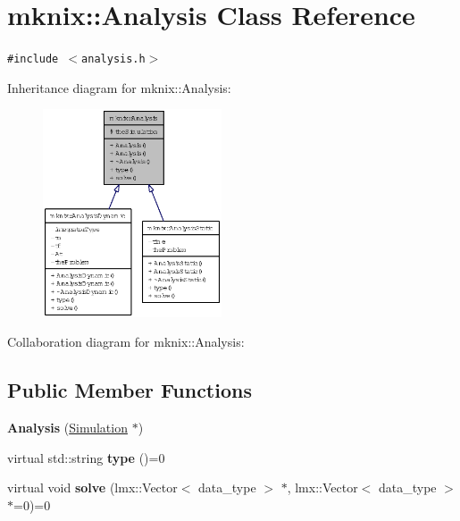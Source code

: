 \hypertarget{classmknix_1_1Analysis}{
\section{mknix::Analysis Class Reference}
\label{classmknix_1_1Analysis}
}
{\tt \#include $<$analysis.h$>$}

Inheritance diagram for mknix::Analysis:\nopagebreak
\begin{figure}[H]
\begin{center}
\leavevmode
\includegraphics[width=150pt]{classmknix_1_1Analysis__inherit__graph}
\end{center}
\end{figure}
Collaboration diagram for mknix::Analysis:\subsection*{Public Member Functions}
\begin{CompactItemize}
\item 
\hypertarget{classmknix_1_1Analysis_58f5b79c2b28457ae18186991306abb3}{
\textbf{Analysis} (\hyperlink{classmknix_1_1Simulation}{Simulation} $\ast$)}
\label{classmknix_1_1Analysis_58f5b79c2b28457ae18186991306abb3}

\item 
\hypertarget{classmknix_1_1Analysis_6dd7026a22ae11f3eef3dad3be370e70}{
virtual std::string \textbf{type} ()=0}
\label{classmknix_1_1Analysis_6dd7026a22ae11f3eef3dad3be370e70}

\item 
\hypertarget{classmknix_1_1Analysis_2a02ee6ab0728bc1ab5e6aab010afe87}{
virtual void \textbf{solve} (lmx::Vector$<$ data\_\-type $>$ $\ast$, lmx::Vector$<$ data\_\-type $>$ $\ast$=0)=0}
\label{classmknix_1_1Analysis_2a02ee6ab0728bc1ab5e6aab010afe87}

\end{CompactItemize}
